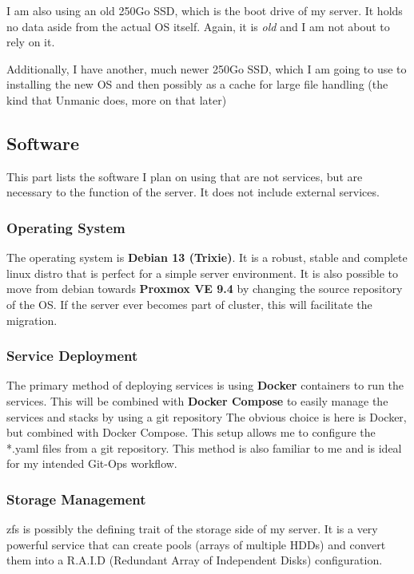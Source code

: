I am also using an old 250\unit{Go} SSD, which is the boot drive of my server. 
It holds no data aside from the actual OS itself. Again, it is \textit{old} and I am not about to rely on it.

Additionally, I have another, much newer 250\unit{Go} SSD, which I am going to use to installing the new OS and then possibly as a cache for large file handling (the kind that Unmanic does, more on that later)

\subsection{Software}
This part lists the software I plan on using that are not services, but are necessary to the function of the server. It does not include external services.

\subsubsection{Operating System}
The operating system is \textbf{Debian 13 (Trixie)}\cite{debian_wiki}. 
It is a robust, stable and complete linux distro that is perfect for a simple server environment.
It is also possible to move from debian towards \textbf{Proxmox VE 9.4} by changing the source repository of the OS. If the server ever becomes part of cluster, this will facilitate the migration.

\subsubsection{Service Deployment}
The primary method of deploying services is using \textbf{Docker} containers to run the services.
This will be combined with \textbf{Docker Compose} to easily manage the services and stacks by using a git repository
The obvious choice is here is Docker, but combined with Docker Compose.
This setup allows me to configure the *.yaml files from a git repository. 
This method is also familiar to me and is ideal for my intended Git-Ops workflow.



\subsubsection{Storage Management}
\gls{zfs} is possibly the defining trait of the storage side of my server.
It is a very powerful service that can create pools (arrays of multiple HDDs) and convert them into a
R.A.I.D (Redundant Array of Independent Disks) configuration.


